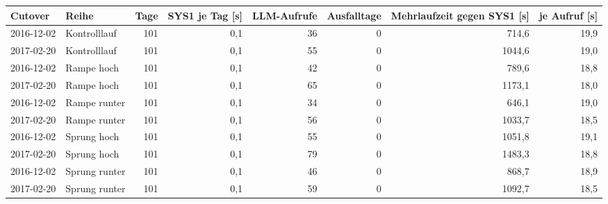\begin{tabular}{llrrrrrr}
\toprule
Cutover & Reihe & Tage & SYS1 je Tag [s] & LLM-Aufrufe & Ausfalltage & Mehrlaufzeit gegen SYS1 [s] & je Aufruf [s] \\
\midrule
2016-12-02 & Kontrolllauf & 101 & 0,1 & 36 & 0 & 714,6 & 19,9 \\
2017-02-20 & Kontrolllauf & 101 & 0,1 & 55 & 0 & 1044,6 & 19,0 \\
2016-12-02 & Rampe hoch & 101 & 0,1 & 42 & 0 & 789,6 & 18,8 \\
2017-02-20 & Rampe hoch & 101 & 0,1 & 65 & 0 & 1173,1 & 18,0 \\
2016-12-02 & Rampe runter & 101 & 0,1 & 34 & 0 & 646,1 & 19,0 \\
2017-02-20 & Rampe runter & 101 & 0,1 & 56 & 0 & 1033,7 & 18,5 \\
2016-12-02 & Sprung hoch & 101 & 0,1 & 55 & 0 & 1051,8 & 19,1 \\
2017-02-20 & Sprung hoch & 101 & 0,1 & 79 & 0 & 1483,3 & 18,8 \\
2016-12-02 & Sprung runter & 101 & 0,1 & 46 & 0 & 868,7 & 18,9 \\
2017-02-20 & Sprung runter & 101 & 0,1 & 59 & 0 & 1092,7 & 18,5 \\
\bottomrule
\end{tabular}
